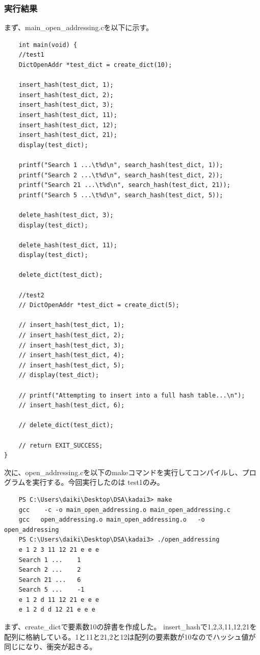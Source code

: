 \documentclass{ltjsarticle}
\begin{document}
\subsubsection{実行結果}\label{subsubsec:実行結果1}
まず、main\_open\_addressing.cを以下に示す。
\begin{lstlisting}
    int main(void) {
    //test1
    DictOpenAddr *test_dict = create_dict(10);

    insert_hash(test_dict, 1);
    insert_hash(test_dict, 2);
    insert_hash(test_dict, 3);
    insert_hash(test_dict, 11);
    insert_hash(test_dict, 12);
    insert_hash(test_dict, 21);
    display(test_dict);

    printf("Search 1 ...\t%d\n", search_hash(test_dict, 1));
    printf("Search 2 ...\t%d\n", search_hash(test_dict, 2));
    printf("Search 21 ...\t%d\n", search_hash(test_dict, 21));
    printf("Search 5 ...\t%d\n", search_hash(test_dict, 5));

    delete_hash(test_dict, 3);
    display(test_dict);

    delete_hash(test_dict, 11);
    display(test_dict);

    delete_dict(test_dict);

    //test2
    // DictOpenAddr *test_dict = create_dict(5);

    // insert_hash(test_dict, 1);
    // insert_hash(test_dict, 2);
    // insert_hash(test_dict, 3);
    // insert_hash(test_dict, 4);
    // insert_hash(test_dict, 5);
    // display(test_dict);  

    // printf("Attempting to insert into a full hash table...\n");
    // insert_hash(test_dict, 6); 

    // delete_dict(test_dict);

    // return EXIT_SUCCESS;
}
\end{lstlisting}
次に、open\_addressing.cを以下のmakeコマンドを実行してコンパイルし、プログラムを実行する。今回実行したのは
test1のみ。
\begin{lstlisting}
    PS C:\Users\daiki\Desktop\DSA\kadai3> make
    gcc    -c -o main_open_addressing.o main_open_addressing.c
    gcc   open_addressing.o main_open_addressing.o   -o open_addressing
    PS C:\Users\daiki\Desktop\DSA\kadai3> ./open_addressing
    e 1 2 3 11 12 21 e e e 
    Search 1 ...    1
    Search 2 ...    2
    Search 21 ...   6
    Search 5 ...    -1
    e 1 2 d 11 12 21 e e e
    e 1 2 d d 12 21 e e e
\end{lstlisting}
まず、create\_dictで要素数10の辞書を作成した。
insert\_hashで1,2,3,11,12,21を配列に格納している。1と11と21,2と12は配列の要素数が10なのでハッシュ値が同じになり、衝突が起きる。
\end{document}
